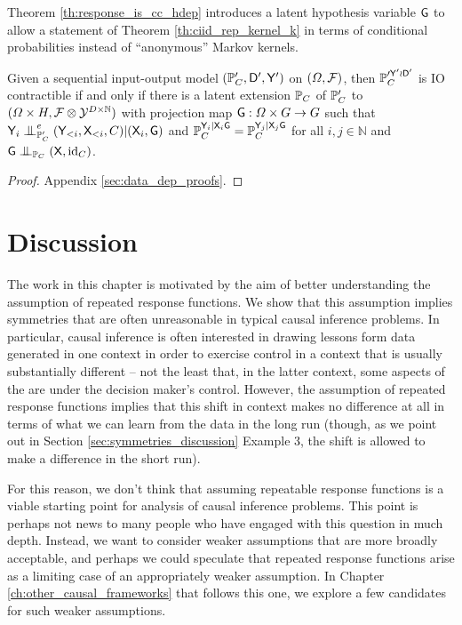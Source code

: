 Theorem \ref{th:response_is_cc_hdep} introduces a latent hypothesis variable $\mathsf{G}$ to allow a statement of Theorem \ref{th:ciid_rep_kernel_k} in terms of conditional probabilities instead of ``anonymous'' Markov kernels.

\begin{theorem}\label{th:response_is_cc_hdep}
Given a sequential input-output model $(\mathbb{P}_C',\mathsf{D}',\mathsf{Y}')$ on $(\Omega,\mathcal{F})$, then $\mathbb{P}_C^{\prime \mathsf{Y}'\wr \mathsf{D}'}$ is IO contractible if and only if there is a latent extension $\mathbb{P}_C$ of $\mathbb{P}_C'$ to $(\Omega\times H,\mathcal{F}\otimes\mathcal{Y}^{D\times\mathbb{N}})$ with projection map $\mathsf{G}:\Omega\times G\to G$ such that $\RV{Y}_i\CI^e_{\prob{P}_C'} (\RV{Y}_{<i},\RV{X}_{<i},C)|(\RV{X}_i,\RV{G})$ and $\mathbb{P}_C^{\mathsf{Y}_i|\mathsf{X}_i\mathsf{G}}=\mathbb{P}_C^{\mathsf{Y}_j|\mathsf{X}_j\mathsf{G}}$ for all $i,j\in \mathbb{N}$ and $\RV{G}\CI_{\prob{P}_C} (\RV{X},\text{id}_C)$.
\end{theorem}

\begin{proof}
Appendix \ref{sec:data_dep_proofs}.
\end{proof}

\section{Discussion}\label{sec:discussion}

The work in this chapter is motivated by the aim of better understanding the assumption of repeated response functions. We show that this assumption implies symmetries that are often unreasonable in typical causal inference problems. In particular, causal inference is often interested in drawing lessons form data generated in one context in order to exercise control in a context that is usually substantially different -- not the least that, in the latter context, some aspects of the are under the decision maker's control. However, the assumption of repeated response functions implies that this shift in context makes no difference at all in terms of what we can learn from the data in the long run (though, as we point out in Section \ref{sec:symmetries_discussion} Example 3, the shift is allowed to make a difference in the short run).

For this reason, we don't think that assuming repeatable response functions is a viable starting point for analysis of causal inference problems. This point is perhaps not news to many people who have engaged with this question in much depth. Instead, we want to consider weaker assumptions that are more broadly acceptable, and perhaps we could speculate that repeated response functions arise as a limiting case of an appropriately weaker assumption. In Chapter \ref{ch:other_causal_frameworks} that follows this one, we explore a few candidates for such weaker assumptions.


